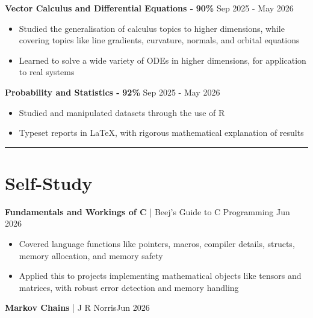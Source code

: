 \documentclass[11pt, a4paper]{article}
\newcommand{\cvline}{\vspace{-4pt}\noindent\rule{\linewidth}{0.5pt}\vspace{-8pt}}
\begin{document}
\vspace{2pt}
{\large\textbf{Vector Calculus and Differential Equations -} \textbf{90\%} \hfill Sep 2025 - May 2026}
\vspace{2pt}

\begin{itemize}[leftmargin=*, itemsep=-3pt, topsep=2pt]
	\item Studied the generalisation of calculus topics to higher dimensions, while covering
		topics like line gradients, curvature, normals, and orbital equations
	\item Learned to solve a wide variety of ODEs in higher dimensions, for application
		to real systems
\end{itemize}


\vspace{2pt}
{\large\textbf{Probability and Statistics -} \textbf{92\%} \hfill Sep 2025 - May 2026}
\vspace{2pt}

\begin{itemize}[leftmargin=*, itemsep=-3pt, topsep=2pt]
	\item Studied and manipulated datasets through the use of R
	\item Typeset reports in LaTeX, with rigorous mathematical explanation of results
\end{itemize}

\cvline
\section{Self-Study}

\vspace{2pt}
{\large\textbf{Fundamentals and Workings of C} | Beej’s Guide to C Programming \hfill	Jun 2026}
\vspace{2pt}

\begin{itemize}[leftmargin=*, itemsep=-3pt, topsep=2pt]
\item Covered language functions like pointers, macros, compiler details, 
  structs, memory allocation, and memory safety
\item Applied this to projects implementing mathematical objects like tensors 
  and matrices, with robust error detection and memory handling
\end{itemize}


\vspace{2pt}
{\large\textbf{Markov Chains} | J R Norris\hfill	Jun 2026}
\vspace{2pt}
\end{document}
